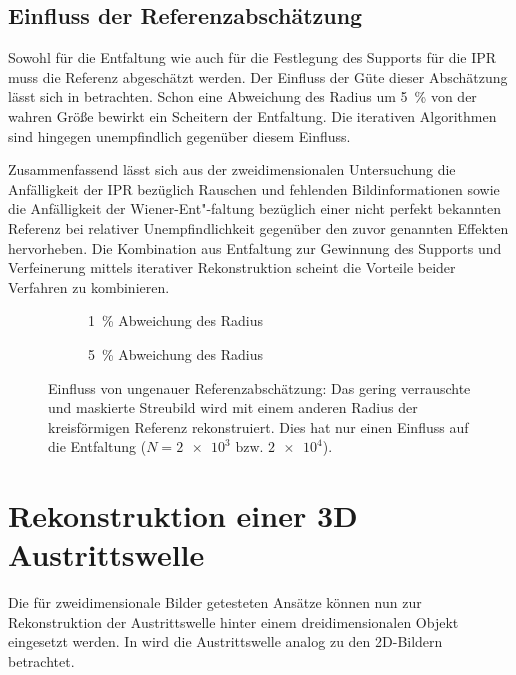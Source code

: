 \subsection{Einfluss der Referenzabschätzung}
Sowohl für die Entfaltung wie auch für die Festlegung des Supports für die IPR muss die Referenz abgeschätzt werden. Der Einfluss der Güte dieser Abschätzung lässt sich in  betrachten. Schon eine Abweichung des Radius um 5~\% von der wahren Größe bewirkt ein Scheitern der Entfaltung. Die iterativen Algorithmen sind hingegen unempfindlich gegenüber diesem Einfluss.

Zusammenfassend lässt sich aus der zweidimensionalen Untersuchung die Anfälligkeit der IPR bezüglich Rauschen und fehlenden Bildinformationen sowie die Anfälligkeit der Wiener-Ent"-faltung bezüglich einer nicht perfekt bekannten Referenz bei relativer Unempfindlichkeit gegenüber den zuvor genannten Effekten hervorheben. Die Kombination aus Entfaltung zur Gewinnung des Supports und Verfeinerung mittels iterativer Rekonstruktion scheint die Vorteile beider Verfahren zu kombinieren.
\begin{figure}[p]
	\begin{subfigure}[b]{0.45\textwidth}
		\caption{1~\% Abweichung des Radius}
	\end{subfigure}
	\hspace*{\fill}
	\begin{subfigure}[b]{0.45\textwidth}
		\caption{5~\% Abweichung des Radius}	
	\end{subfigure}
	\caption[2D Rekonstruktion: Einfluss ungenauer Referenzabschätzung]{Einfluss von ungenauer Referenzabschätzung: Das gering verrauschte und maskierte Streubild wird mit einem anderen Radius der kreisförmigen Referenz rekonstruiert. Dies hat nur einen Einfluss auf die Entfaltung ($N=\num{2e3} \text{ bzw. }\num{2e4}$).}
	\label{fig:recon2d-ref}
\end{figure}
 \clearpage
\section{Rekonstruktion einer 3D Austrittswelle}
Die für zweidimensionale Bilder getesteten Ansätze können nun zur Rekonstruktion der Austrittswelle hinter einem dreidimensionalen Objekt eingesetzt werden. In  wird die Austrittswelle analog zu den 2D-Bildern betrachtet.
	
